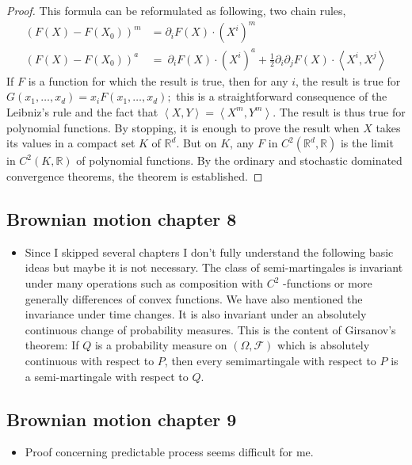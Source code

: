 \begin{itemize}
\begin{theorem}
\begin{proof}
	This formula can be reformulated as following, two chain rules, 
	\[ 
	\begin{aligned}
\left( F(X)-F(X_0)\right)^m &= \partial_i F(X)\cdot (X^i)^m \\
\left( F(X)-F(X_0)\right)^a &=\ \partial_i F(X)\cdot (X^i)^a + \frac{1}{2} \partial_i \partial_j F(X)\cdot \left\langle X^{i}, X^{j}\right\rangle
	\end{aligned}
	 \]
	If $F$ is a function for which the result is true, then for any $i$, the result is true for $G\left(x_{1}, \ldots, x_{d}\right)=x_{i} F\left(x_{1}, \ldots, x_{d}\right) ;$ this is a straightforward consequence of the Leibniz's rule and the fact that $ \left\langle X,Y \right\rangle = \left\langle X^m,Y^m \right\rangle $. The result is thus true for polynomial functions. By stopping, it is enough to prove the result when $X$ takes its values in a compact set $K$ of $\mathbb{R}^{d}$.  But on $K$, any $F$ in $C^{2}\left(\mathbb{R}^{d}, \mathbb{R}\right)$ is the limit in $C^{2}(K, \mathbb{R})$ of polynomial functions. By the ordinary and stochastic dominated convergence theorems, the theorem is established.
\end{proof}
\end{theorem}
\end{itemize}
\subsection{Brownian motion chapter 8}
\begin{itemize}
	\item Since I skipped several chapters I don't fully understand the following basic ideas but maybe it is not necessary.
	The class of semi-martingales is invariant under many operations such as composition with $C^{2}$ -functions or more generally differences of convex functions. We have also mentioned the invariance under time changes. It is also invariant under an absolutely continuous change of probability measures. This is the content of Girsanov's theorem: If $Q$ is a probability measure on $(\Omega, \mathscr{F})$ which is absolutely continuous with respect to $P$, then every semimartingale with respect to $P$ is a semi-martingale with respect to $Q$.  
\end{itemize}
\subsection{Brownian motion chapter 9}
\begin{itemize}
	\item Proof concerning predictable process seems difficult for me.
\end{itemize}